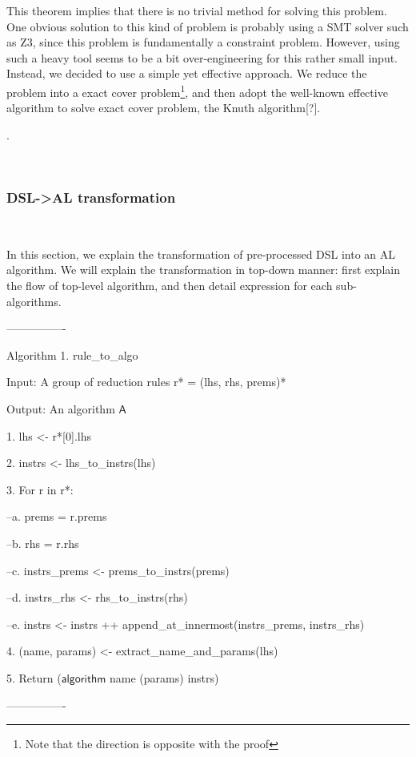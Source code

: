 This theorem implies that there is no trivial method for solving this problem.
One obvious solution to this kind of problem is probably using a SMT solver such as Z3, since
this problem is fundamentally a constraint problem.
However, using such a heavy tool seems to be a bit over-engineering for this rather small input.
Instead, we decided to use a simple yet effective approach.
We reduce the problem into a exact cover problem\footnote{Note that the direction is opposite with
the proof}, and then adopt the well-known effective algorithm to solve exact cover problem,
the Knuth algorithm[?].

.


~

\subsubsection{\textbf{DSL->AL transformation}}~

In this section, we explain the transformation of pre-processed DSL into an AL algorithm.
We will explain the transformation in top-down manner:
first explain the flow of top-level algorithm,
and then detail expression for each sub-algorithms.

----------------

Algorithm 1. rule\_to\_algo

Input: A group of reduction rules r* = (lhs, rhs, prems)*

Output: An algorithm $\mathsf{A}$

1. lhs <- r*[0].lhs

2. instrs <- lhs\_to\_instrs(lhs)

3. For r in r*:

--a. prems = r.prems

--b. rhs = r.rhs

--c. instrs\_prems <- prems\_to\_instrs(prems)

--d. instrs\_rhs <- rhs\_to\_instrs(rhs)

--e. instrs <- instrs ++ append\_at\_innermost(instrs\_prems, instrs\_rhs)

4. (name, params) <- extract\_name\_and\_params(lhs)

5. Return ($\mathsf{algorithm}$ name (params) {instrs})

----------------


